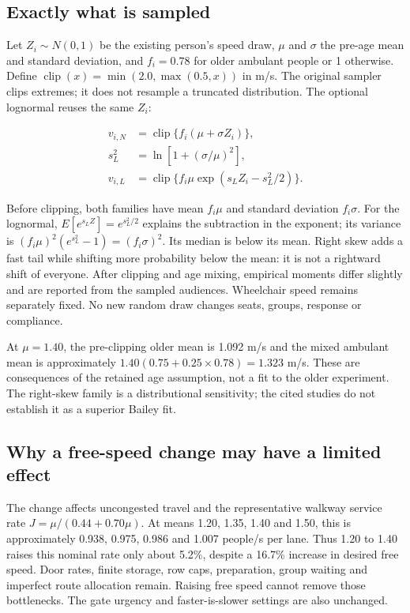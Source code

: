 \documentclass[11pt,a4paper]{article}
\begin{document}
\subsection{Exactly what is sampled}

Let $Z_i\sim N(0,1)$ be the existing person's speed draw, $\mu$ and $\sigma$ the pre-age mean and standard deviation, and $f_i=0.78$ for older ambulant people or 1 otherwise. Define $\operatorname{clip}(x)=\min(2.0,\max(0.5,x))$ in m/s. The original sampler clips extremes; it does not resample a truncated distribution. The optional lognormal reuses the same $Z_i$:


\begin{equation}
\begin{aligned}
 v_{i,N}&=\operatorname{clip}\{f_i(\mu+\sigma Z_i)\},\\
 s_L^2&=\ln\!\left[1+(\sigma/\mu)^2\right],\\
 v_{i,L}&=\operatorname{clip}\{f_i\mu\exp(s_LZ_i-s_L^2/2)\}.
\end{aligned}\tag{33}\label{eq:33}
\end{equation}

Before clipping, both families have mean $f_i\mu$ and standard deviation $f_i\sigma$. For the lognormal, $E[e^{s_LZ}]=e^{s_L^2/2}$ explains the subtraction in the exponent; its variance is $(f_i\mu)^2(e^{s_L^2}-1)=(f_i\sigma)^2$. Its median is below its mean. Right skew adds a fast tail while shifting more probability below the mean: it is not a rightward shift of everyone. After clipping and age mixing, empirical moments differ slightly and are reported from the sampled audiences. Wheelchair speed remains separately fixed. No new random draw changes seats, groups, response or compliance.


At $\mu=1.40$, the pre-clipping older mean is 1.092 m/s and the mixed ambulant mean is approximately $1.40(0.75+0.25\times0.78)=1.323$ m/s. These are consequences of the retained age assumption, not a fit to the older experiment. The right-skew family is a distributional sensitivity; the cited studies do not establish it as a superior Bailey fit.


\subsection{Why a free-speed change may have a limited effect}

The change affects uncongested travel and the representative walkway service rate $J=\mu/(0.44+0.70\mu)$. At means 1.20, 1.35, 1.40 and 1.50, this is approximately 0.938, 0.975, 0.986 and 1.007 people/s per lane. Thus 1.20 to 1.40 raises this nominal rate only about 5.2\%, despite a 16.7\% increase in desired free speed. Door rates, finite storage, row caps, preparation, group waiting and imperfect route allocation remain. Raising free speed cannot remove those bottlenecks. The gate urgency and faster-is-slower settings are also unchanged.
\end{document}
